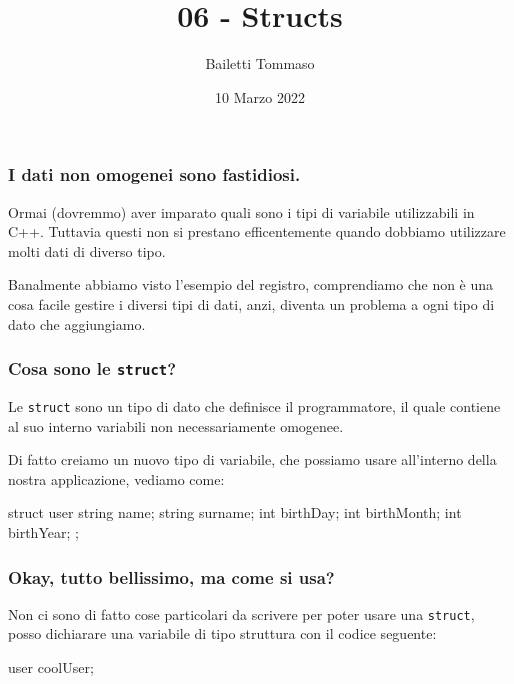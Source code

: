\documentclass{beamer}
\title{06 - Structs}
\author{Bailetti Tommaso}
\institute{ITI Don Orione}
\date{10 Marzo 2022}
\begin{document}
    \begin{frame}
        \titlepage
    \end{frame}
    
    \begin{frame}
        \frametitle{I dati non omogenei sono fastidiosi.}
    
        Ormai (dovremmo) aver imparato quali sono i tipi di variabile utilizzabili in C++. Tuttavia questi non si prestano efficentemente quando dobbiamo utilizzare molti dati di diverso tipo.

        Banalmente abbiamo visto l'esempio del registro, comprendiamo che non è una cosa facile gestire i diversi tipi di dati, anzi, diventa un problema a ogni tipo di dato che aggiungiamo.
    
    \end{frame}

    \begin{frame}[fragile]
        \frametitle{Cosa sono le \texttt{struct}?}
    
        Le \texttt{struct} sono un tipo di dato che definisce il programmatore, il quale contiene al suo interno variabili non necessariamente omogenee.

        Di fatto creiamo un nuovo tipo di variabile, che possiamo usare all'interno della nostra applicazione, vediamo come:

        \begin{cppcode}
            struct user {
                string name;
                string surname;
                int birthDay;
                int birthMonth;
                int birthYear;
            };
        \end{cppcode}
    
    \end{frame}

    \begin{frame}[fragile]
        \frametitle{Okay, tutto bellissimo, ma come si usa?}
    
        Non ci sono di fatto cose particolari da scrivere per poter usare una \texttt{struct}, posso dichiarare una variabile di tipo struttura con il codice seguente:

        \begin{cppcode}
            user coolUser;
        \end{cppcode}
    
    \end{frame}
\end{document}
